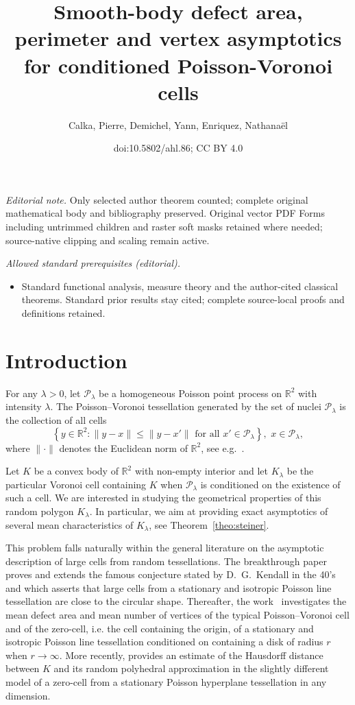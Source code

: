 \documentclass[10pt]{amsart}
\title{Smooth-body defect area, perimeter and vertex asymptotics for conditioned Poisson-Voronoi cells}
\author{Calka, Pierre, Demichel, Yann, Enriquez, Nathanaël}
\date{doi:10.5802/ahl.86; CC BY 4.0}
\theoremstyle{definition}\newtheorem{defi}[theo]{Definition}\newtheorem{rema}[theo]{Remark}\newtheorem{exam}[theo]{Example}\newtheorem{exem}[theo]{Example}\newtheorem{nota}[theo]{Notation}
\newcommand{\cP}{\mathcal{P}}
\newcommand{\R}{\mathbb{R}}
\newcommand{\pass}{\vspace{0.3cm}\noindent}
\newcommand{\noi}{\noindent}
\begin{document}
\maketitle
\noindent\textit{Editorial note.} Only selected author theorem counted; complete original mathematical body and bibliography preserved. Original vector PDF Forms including untrimmed children and raster soft masks retained where needed; source-native clipping and scaling remain active.\par\medskip
\noindent\textit{Allowed standard prerequisites (editorial).}\begin{itemize}
\item Standard functional analysis, measure theory and the author-cited classical theorems. Standard prior results stay cited; complete source-local proofs and definitions retained.
\end{itemize}\medskip


\section{Introduction}\label{sec:intro}

For any $\lambda>0$, let $\cP_{\lambda}$ be a homogeneous Poisson point process on $\R^2$ with intensity $\lambda$. The Poisson--Voronoi tessellation generated by the set of nuclei $\cP_\lambda$ is the collection of all cells
\[
\left\{y\in\R^2:\|y-x\|\le \|y-x'\| \text{ for all } x'\in \cP_\lambda\right\}, \,\, x\in \cP_\lambda,
\]
where $\|\cdot\|$ denotes the Euclidean norm of $\R^2$, see e.g.~\cite{mol94,okabe}.

Let $K$ be a convex body of $\R^2$ with non-empty interior and let $K_{\lambda}$ be the particular Voronoi cell containing $K$ when $\cP_\lambda$ is conditioned on the existence of such a cell. We are interested in studying the geometrical properties of this random polygon $K_{\lambda}$. In particular, we aim at providing exact asymptotics of several mean characteristics of $K_{\lambda}$, see Theorem~\ref{theo:steiner}.

This problem falls naturally within the general literature on the asymptotic description of large cells from random tessellations. The breakthrough paper~\cite{hrs04} proves and extends the famous conjecture stated by D.~G.~Kendall in the 40's and which asserts that large cells from a stationary and isotropic Poisson line tessellation are close to the circular shape. Thereafter, the work~\cite{cs05} investigates the mean defect area and mean number of vertices of the typical Poisson--Voronoi cell and of the zero-cell, i.e. the cell containing the origin, of a stationary and isotropic Poisson line tessellation conditioned on containing a disk of radius $r$ when $r\to\infty$. More recently, \cite{hs14} provides an estimate of the Hausdorff distance between $K$ and its random polyhedral approximation in the slightly different model of a zero-cell from a stationary Poisson hyperplane tessellation in any dimension.
\end{document}
